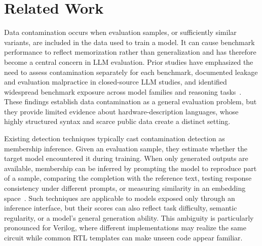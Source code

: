 \section{Related Work}
Data contamination occurs when evaluation samples, or sufficiently similar variants, are included in the data used to train a model. It can cause benchmark performance to reflect memorization rather than generalization and has therefore become a central concern in LLM evaluation. Prior studies have emphasized the need to assess contamination separately for each benchmark, documented leakage and evaluation malpractice in closed-source LLM studies, and identified widespread benchmark exposure across model families and reasoning tasks~\cite{sainz2023nlp,balloccu2024leak,xu2024benchmarking}. These findings establish data contamination as a general evaluation problem, but they provide limited evidence about hardware-description languages, whose highly structured syntax and scarce public data create a distinct setting.

Existing detection techniques typically cast contamination detection as membership inference. Given an evaluation sample, they estimate whether the target model encountered it during training. When only generated outputs are available, membership can be inferred by prompting the model to reproduce part of a sample, comparing the completion with the reference text, testing response consistency under different prompts, or measuring similarity in an embedding space~\cite{golchin2024time,golchin2025data,he2025towards,dong2024generalization}. Such techniques are applicable to models exposed only through an inference interface, but their scores can also reflect task difficulty, semantic regularity, or a model's general generation ability. This ambiguity is particularly pronounced for Verilog, where different implementations may realize the same circuit while common RTL templates can make unseen code appear familiar.

